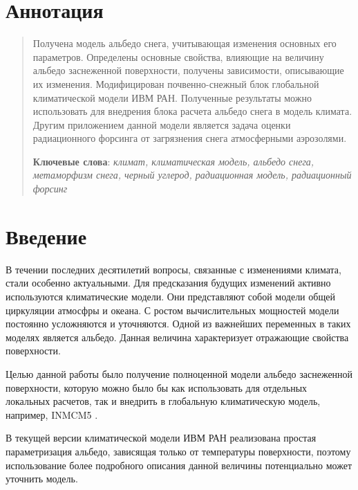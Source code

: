 \documentclass[a4paper, fontsize=14pt]{scrartcl}
\begin{document}
\section*{Аннотация}
\begin{abstract}

Получена модель альбедо снега, учитывающая изменения основных его параметров. Определены основные свойства, влияющие на величину альбедо заснеженной поверхности, получены зависимости, описывающие их изменения. Модифицирован почвенно-снежный блок глобальной климатической модели ИВМ РАН. Полученные результаты можно использовать для внедрения блока расчета альбедо снега в модель климата. Другим приложением данной модели является задача оценки радиационного форсинга от загрязнения снега атмосферными аэрозолями. 
  
  \bigskip
  \textbf{Ключевые слова}: \emph{климат, климатическая модель, альбедо снега, метаморфизм снега, черный углерод, радиационная модель, радиационный форсинг}
\end{abstract}


\newpage
{}
{}
\tableofcontents


\newpage
\section*{Введение}

В течении последних десятилетий вопросы, связанные с изменениями климата, стали особенно актуальными. Для предсказания будущих изменений активно используются климатические модели. Они представляют собой модели общей циркуляции атмосфры и океана. С ростом вычислительных мощностей модели постоянно усложняются и уточняются. Одной из важнейших переменных в таких моделях является альбедо. Данная величина характеризует отражающие свойства поверхности.

Целью данной работы было получение полноценной модели альбедо заснеженной поверхности, которую можно было бы как использовать для отдельных локальных расчетов, так и внедрить в глобальную климатическую модель, например, INMCM5 \cite{Volodin2017}.  

В текущей версии климатической модели ИВМ РАН реализована простая параметризация альбедо, зависящая только от температуры поверхности, поэтому использование более подробного описания данной величины потенциально может уточнить модель. 
\end{document}
